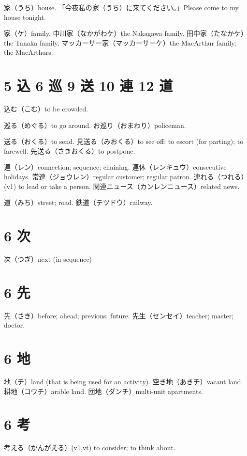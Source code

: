 家（うち）house.
「今夜私の家（うち）に来てください。」Please come to my house tonight.

家（ケ）family.
中川家（なかがわケ）the Nakagawa family.
田中家（たなかケ）the Tanaka family.
マッカーサー家（マッカーサーケ）the MacArthur family; the MacArthurs.

\section{5 込 6 巡 9 送 10 連 12 道}

込む（こむ）to be crowded.

巡る（めぐる）to go around.
お巡り（おまわり）policeman.

送る（おくる）to send.
見送る（みおくる）to see off; to escort (for parting); to farewell.
先送る（さきおくる）to postpone.

連（レン）connection; sequence; chaining.
連休（レンキュウ）consecutive holidays.
常連（ジョウレン）regular customer; regular patron.
連れる（つれる）(v1) to lead or take a person.
関連ニュース（カンレンニュース）related news.

道（みち）street; road.
鉄道（テツドウ）railway.

\section{6 次}

次（つぎ）next (in sequence)

\section{6 先}

先（さき）before; ahead; previous; future.
先生（センセイ）teacher; master; doctor.

\section{6 地}

地（チ）land (that is being used for an activity).
空き地（あきチ）vacant land.
耕地（コウチ）arable land.
団地（ダンチ）multi-unit apartments.

\section{6 考}

考える（かんがえる）(v1,vt) to consider; to think about.

